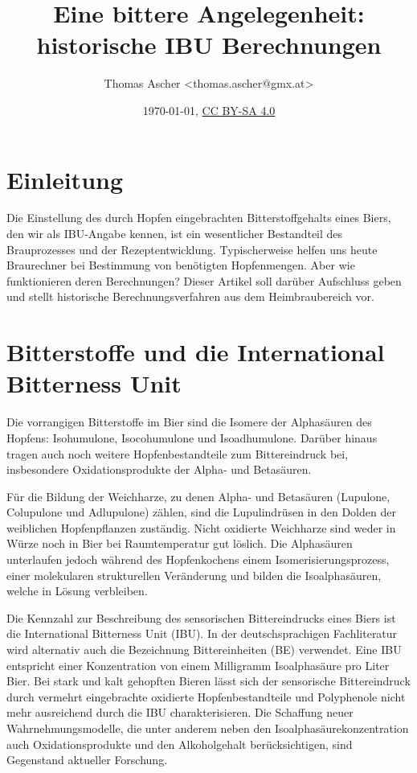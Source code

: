 \documentclass[a4paper,parskip=half]{scrartcl}
\title{Eine bittere Angelegenheit: historische IBU Berechnungen}
\author{Thomas Ascher <thomas.ascher@gmx.at>}
\date{\today, \href{http://creativecommons.org/licenses/by-sa/4.0/}{CC BY-SA 4.0}}
\begin{document}
\maketitle

\section*{Einleitung}

Die Einstellung des durch Hopfen eingebrachten Bitterstoffgehalts eines Biers, den wir als IBU-Angabe kennen, ist ein wesentlicher Bestandteil des Brauprozesses und der Rezeptentwicklung. Typischerweise helfen uns heute Braurechner bei Bestimmung von benötigten Hopfenmengen. Aber wie funktionieren deren Berechnungen? Dieser Artikel soll darüber Aufschluss geben und stellt historische Berechnungsverfahren aus dem Heimbraubereich vor.

\section*{Bitterstoffe und die International Bitterness Unit}

Die vorrangigen Bitterstoffe im Bier sind die Isomere der Alphasäuren des Hopfens: Isohumulone, Isocohumulone und Isoadhumulone. Darüber hinaus tragen auch noch weitere Hopfenbestandteile zum Bittereindruck bei, insbesondere Oxidationsprodukte der Alpha- und Betasäuren. \parencite{MEBAK2020}

Für die Bildung der Weichharze, zu denen Alpha- und Betasäuren (Lupulone, Colupulone und Adlupulone) zählen, sind die Lupulindrüsen in den Dolden der weiblichen Hopfenpflanzen zuständig. Nicht oxidierte Weichharze sind weder in Würze noch in Bier bei Raumtemperatur gut löslich. Die Alphasäuren unterlaufen jedoch während des Hopfenkochens einem Isomerisierungsprozess, einer molekularen strukturellen Veränderung und bilden die Isoalphasäuren, welche in Lösung verbleiben. \parencites{Hall1997}[20-23]{Nottebohm2020}

Die Kennzahl zur Beschreibung des sensorischen Bittereindrucks eines Biers ist die International Bitterness Unit (IBU). In der deutschsprachigen Fachliteratur wird alternativ auch die Bezeichnung Bittereinheiten (BE) verwendet. Eine IBU entspricht einer Konzentration von einem Milligramm Isoalphasäure pro Liter Bier. Bei stark und kalt gehopften Bieren lässt sich der sensorische Bittereindruck durch vermehrt eingebrachte oxidierte Hopfenbestandteile und Polyphenole nicht mehr ausreichend durch die IBU charakterisieren. Die Schaffung neuer Wahrnehmungsmodelle, die unter anderem neben den Isoalphasäurekonzentration auch Oxidationsprodukte und den Alkoholgehalt berücksichtigen, sind Gegenstand aktueller Forschung. \parencite{Kishimoto2021}
\end{document}
